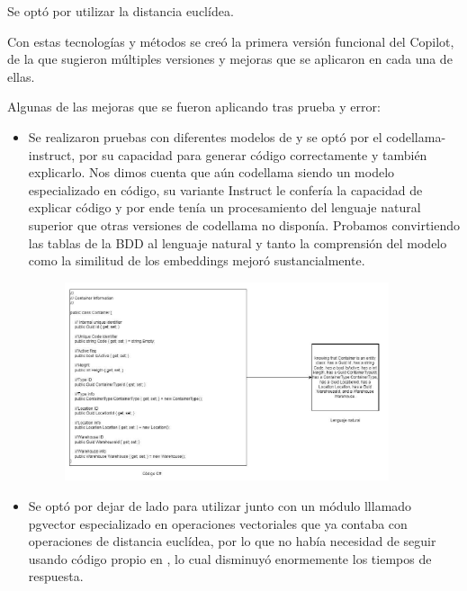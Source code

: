 Se optó por utilizar la distancia euclídea.

\newpage

Con estas tecnologías y métodos se creó la primera versión funcional del Copilot, de la que sugieron múltiples versiones y mejoras que se aplicaron en cada una de ellas.

Algunas de las mejoras que se fueron aplicando tras prueba y error:

\begin{itemize}
    \item Se realizaron pruebas con diferentes modelos de \href{https://ollama.com/}{} y se optó por el codellama-instruct, por su capacidad para generar código correctamente y también explicarlo. Nos dimos cuenta que aún codellama siendo un modelo especializado en código, su variante Instruct le confería la capacidad de explicar código y por ende tenía un procesamiento del lenguaje natural superior que otras versiones de codellama no disponía. Probamos convirtiendo las tablas de la BDD al lenguaje natural y tanto la comprensión del modelo como la similitud de los embeddings mejoró sustancialmente.
    \begin{figure}[htbp]
        \centering
        \includegraphics[width=0.9\textwidth]{Chapters/cap6.PNG}
        \label{fig:mi_imagen3}
    \end{figure}
    \item Se optó por dejar de lado \href{https://www.sqlite.org/}{} para utilizar \href{https://www.postgresql.org/}{} junto con un módulo lllamado pgvector especializado en operaciones vectoriales que ya contaba con operaciones de distancia euclídea, por lo que no había necesidad de seguir usando código propio en \href{https://dotnet.microsoft.com/es-es/languages/csharp}{}, lo cual disminuyó enormemente los tiempos de respuesta.

\end{itemize}
